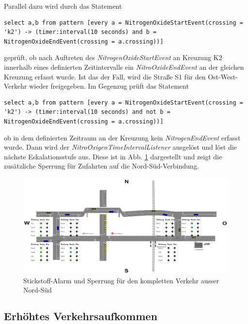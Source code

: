 Parallel dazu wird durch das Statement

\begin{lstlisting}
select a,b from pattern [every a = NitrogenOxideStartEvent(crossing = 'k2') -> (timer:interval(10 seconds) and b = NitrogenOxideEndEvent(crossing = a.crossing))]
\end{lstlisting}

geprüft, ob nach Auftreten des \textit{NitrogenOxideStartEvent} an Kreuzung K2 innerhalb eines definierten Zeitintervalls ein \textit{NitroOxideEndEvent} an der gleichen Kreuzung erfasst wurde. Ist das der Fall, wird die Straße S1 für den Ost-West-Verkehr wieder freigegeben. Im Gegenzug prüft das Statement

\begin{lstlisting}
select a,b from pattern [every a = NitrogenOxideStartEvent(crossing = 'k2') -> (timer:interval(10 seconds) and not b = NitrogenOxideEndEvent(crossing = a.crossing))]
\end{lstlisting}

ob in dem definierten Zeitraum an der Kreuzung kein \textit{NitrogenEndEvent} erfasst wurde. Dann wird der \textit{NitroOxigenTimeIntervalListener} ausgelöst und löst die nächste Eskalationsstufe aus. Diese ist in Abb. \ref{fig9} dargestellt und zeigt die zusätzliche Sperrung für Zufahrten auf die Nord-Süd-Verbindung.

\begin{figure}[ht]
	\includegraphics[width=\textwidth]{images/NitroOxigenStillHigh.png}
	\caption{Stickstoff-Alarm und Sperrung für den kompletten Verkehr ausser Nord-Süd}
	\label{fig9}
\end{figure}


\subsection{Erhöhtes Verkehrsaufkommen}

